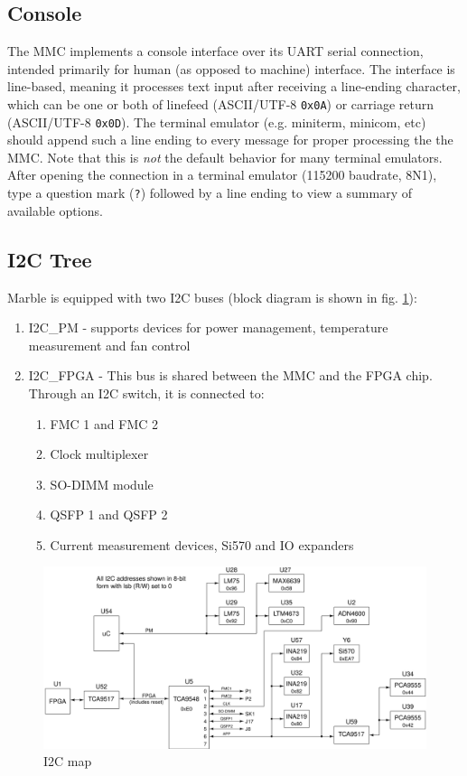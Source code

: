 \documentclass[12pt,oneside,a4]{article}
\begin{document}
\subsection{Console}\label{sec:MMC:Console}
The MMC implements a console interface over its UART serial connection, intended primarily for human (as opposed to machine) interface.
The interface is line-based, meaning it processes text input after receiving a line-ending character, which can be one or both of
linefeed (ASCII/UTF-8 {\tt 0x0A}) or carriage return (ASCII/UTF-8 {\tt 0x0D}).
The terminal emulator (e.g. miniterm, minicom, etc) should append such a line ending to every message for proper processing the the MMC.
Note that this is \emph{not} the default behavior for many terminal emulators.
After opening the connection in a terminal emulator (115200 baudrate, 8N1), type a question mark ({\tt ?}) followed by a line ending to
view a summary of available options.

\subsection{I2C Tree}
Marble is equipped with two I2C buses (block diagram is shown in fig. \ref{i2c}):
\begin{enumerate}
	\item I2C\_PM - supports devices for power management, temperature measurement and fan control
	\item I2C\_FPGA - This bus is shared between the MMC and the FPGA chip. Through an I2C switch, it is connected to:
	\begin{enumerate}
		\item FMC 1 and FMC 2
		\item Clock multiplexer
		\item SO-DIMM module
		\item QSFP 1 and QSFP 2
		\item Current measurement devices, Si570 and IO expanders
	\end{enumerate}
\end{enumerate}
\begin{figure}[H]
\begin{center}
\includegraphics[width=1\linewidth]{marble2_i2c.png}
 \caption{I2C map}\label{i2c}
\end{center}
\end{figure}
\end{document}
